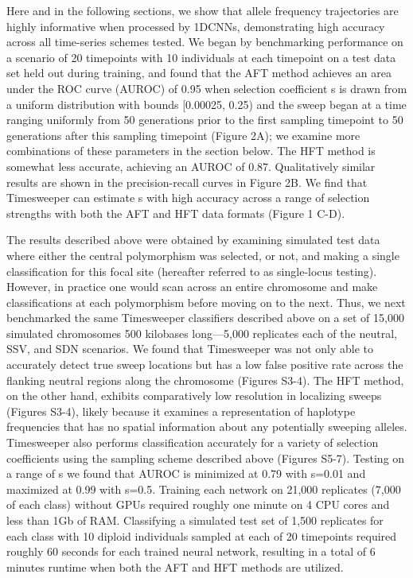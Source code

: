 Here and in the following sections, we show that allele frequency trajectories are highly informative when processed by 1DCNNs, demonstrating high accuracy across all time-series schemes tested. We began by benchmarking performance on a scenario of 20 timepoints with 10 individuals at each timepoint on a test data set held out during training, and found that the AFT method achieves an area under the ROC curve (AUROC) of 0.95 when selection coefficient s is drawn from a uniform distribution with bounds [0.00025, 0.25) and the sweep began at a time ranging uniformly from 50 generations prior to the first sampling timepoint to 50 generations after this sampling timepoint (Figure 2A); we examine more combinations of these parameters in the section below. The HFT method is somewhat less accurate, achieving an AUROC of 0.87. Qualitatively similar results are shown in the precision-recall curves in Figure 2B. We find that Timesweeper can estimate s with high accuracy across a range of selection strengths with both the AFT and HFT data formats (Figure 1 C-D). 

The results described above were obtained by examining simulated test data where either the central polymorphism was selected, or not, and making a single classification for this focal site (hereafter referred to as single-locus testing). However, in practice one would scan across an entire chromosome and make classifications at each polymorphism before moving on to the next. Thus, we next benchmarked the same Timesweeper classifiers described above on a set of 15,000 simulated chromosomes 500 kilobases long—5,000 replicates each of the neutral, SSV, and SDN scenarios. We found that Timesweeper was not only able to accurately detect true sweep locations but has a low false positive rate across the flanking neutral regions along the chromosome (Figures S3-4). The HFT method, on the other hand, exhibits comparatively low resolution in localizing sweeps (Figures S3-4), likely because it examines a representation of haplotype frequencies that has no spatial information about any potentially sweeping alleles. Timesweeper also performs classification accurately for a variety of selection coefficients using the sampling scheme described above (Figures S5-7). Testing on a range of s we found that AUROC is minimized at 0.79 with s=0.01 and maximized at 0.99 with s=0.5. 
Training each network on 21,000 replicates (7,000 of each class) without GPUs required roughly one minute on 4 CPU cores and less than 1Gb of RAM. Classifying a simulated test set of 1,500 replicates for each class with 10 diploid individuals sampled at each of 20 timepoints required roughly 60 seconds for each trained neural network, resulting in a total of 6 minutes runtime when both the AFT and HFT methods are utilized. \\

